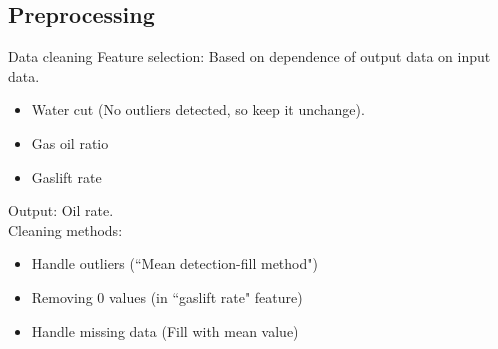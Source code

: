 \documentclass[xcolor=table, 11pt]{beamer}
\begin{document}
\subsection{Preprocessing}
\begin{frame}{Data cleaning}
Feature selection: Based on dependence of output data on input data.
    \begin{itemize}
        \item Water cut (No outliers detected, so keep it unchange).
        \item Gas oil ratio
        \item Gaslift rate
    \end{itemize}
Output: Oil rate.\\
Cleaning methods:
    \begin{itemize}
        \item Handle outliers (``Mean detection-fill method")
        \item Removing 0 values (in ``gaslift rate" feature)
        \item Handle missing data (Fill with mean value)
    \end{itemize}
\end{frame}
\end{document}
